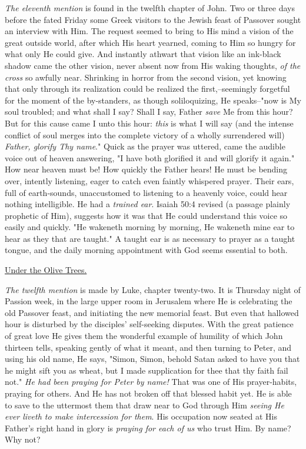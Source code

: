 \textit{The eleventh mention} is found in the twelfth chapter of John. Two or
three days before the fated Friday some Greek visitors to the Jewish feast
of Passover sought an interview with Him. The request seemed to bring to
His mind a vision of the great outside world, after which His heart
yearned, coming to Him so hungry for what only He could give. And
instantly athwart that vision like an ink-black shadow came the other
vision, never absent now from His waking thoughts, \textit{of the cross} so
awfully near. Shrinking in horror from the second vision, yet knowing that
only through its realization could be realized the first,--seemingly
forgetful for the moment of the by-standers, as though soliloquizing, He
speaks--"now is My soul troubled; and what shall I say? Shall I say,
Father \textit{save} Me from this hour? But for this cause came I unto this hour:
\textit{this} is what I will say (and the intense conflict of soul merges into
the complete victory of a wholly surrendered will) \textit{Father, glorify Thy
name}." Quick as the prayer was uttered, came the audible voice out of
heaven answering, "I have both glorified it and will glorify it again."
How near heaven must be! How quickly the Father hears! He must be bending
over, intently listening, eager to catch even faintly whispered prayer.
Their ears, full of earth-sounds, unaccustomed to listening to a heavenly
voice, could hear nothing intelligible. He had a \textit{trained ear}. Isaiah
50:4 revised (a passage plainly prophetic of Him), suggests how it was
that He could understand this voice so easily and quickly. "He wakeneth
morning by morning, He wakeneth mine ear to hear as they that are taught."
A taught ear is as necessary to prayer as a taught tongue, and the daily
morning appointment with God seems essential to both.



\underline{Under the Olive Trees.}


\textit{The twelfth mention} is made by Luke, chapter twenty-two. It is Thursday
night of Passion week, in the large upper room in Jerusalem where He is
celebrating the old Passover feast, and initiating the new memorial feast.
But even that hallowed hour is disturbed by the disciples' self-seeking
disputes. With the great patience of great love He gives them the
wonderful example of humility of which John thirteen tells, speaking
gently of what it meant, and then turning to Peter, and using his old
name, He says, "Simon, Simon, behold Satan asked to have you that he might
sift you as wheat, but I made supplication for thee that thy faith fail
not." \textit{He had been praying for Peter by name!} That was one of His
prayer-habits, praying for others. And He has not broken off that blessed
habit yet. He is able to save to the uttermost them that draw near to God
through Him \textit{seeing He ever liveth to make intercession for them}. His
occupation now seated at His Father's right hand in glory is \textit{praying for
each of us} who trust Him. By name? Why not?


